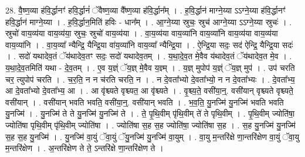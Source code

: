 \documentclass[17pt]{extarticle}
\begin{document}
28. वै॒ष्ण॒व्या ह॑वि॒र्द्धानꣳ॑ हवि॒र्द्धानं॑ ॅवैष्ण॒व्या वै᳚ष्ण॒व्या ह॑वि॒र्द्धान᳚म् । . ह॒वि॒र्द्धान॑ माग्ने॒य्या ऽऽग्ने॒य्या ह॑वि॒र्द्धानꣳ॑ हवि॒र्द्धान॑ माग्ने॒य्या । . ह॒वि॒र्द्धान॒मिति॑ हविः - धान᳚म् । . आ॒ग्ने॒य्या स्रुचः॒ स्रुच॑ आग्ने॒य्या ऽऽग्ने॒य्या स्रुचः॑ । . स्रुचो॑ वाय॒व्य॑या वाय॒व्य॑या॒ स्रुचः॒ स्रुचो॑ वाय॒व्य॑या । . वा॒य॒व्य॑या वाय॒व्या॑नि वाय॒व्या॑नि वाय॒व्य॑या वाय॒व्य॑या वाय॒व्या॑नि । . वा॒य॒व्या᳚ न्यैन्द्रि॒ यैन्द्रि॒या वा॑य॒व्या॑नि वाय॒व्या᳚ न्यैन्द्रि॒या । . ऐ॒न्द्रि॒या सदः॒ सद॑ ऐन्द्रि॒ यैन्द्रि॒या सदः॑ । . सदो॑ यथादेव॒तं ॅय॑थादेव॒तꣳ सदः॒ सदो॑ यथादेव॒तम् । . य॒था॒दे॒व॒त मे॒वैव य॑थादेव॒तं ॅय॑थादेव॒त मे॒व । . य॒था॒दे॒व॒तमिति॑ यथा - दे॒व॒तम् । . ए॒व य॒ज्ञ्ं ॅय॒ज्ञ् मे॒वैव य॒ज्ञ्म् । . य॒ज्ञ् मुपोप॑ य॒ज्ञ्ं ॅय॒ज्ञ् मुप॑ । . उप॑ चरति चर॒ त्युपोप॑ चरति । . च॒र॒ति॒ न न च॑रति चरति॒ न । . न दे॒वता᳚भ्यो दे॒वता᳚भ्यो॒ न न दे॒वता᳚भ्यः । . दे॒वता᳚भ्य॒ आ दे॒वता᳚भ्यो दे॒वता᳚भ्य॒ आ । . आ वृ॑श्च्यते वृश्च्यत॒ आ वृ॑श्च्यते । . वृ॒श्च्य॒ते॒ वसी॑या॒न्॒. वसी॑यान् वृश्च्यते वृश्च्यते॒ वसी॑यान् । . वसी॑यान् भवति भवति॒ वसी॑या॒न्॒. वसी॑यान् भवति । . भ॒व॒ति॒ यु॒नज्मि॑ यु॒नज्मि॑ भवति भवति यु॒नज्मि॑ । . यु॒नज्मि॑ ते ते यु॒नज्मि॑ यु॒नज्मि॑ ते । . ते॒ पृ॒थि॒वीम् पृ॑थि॒वीम् ते॑ ते पृथि॒वीम् । . पृ॒थि॒वीम् ज्योति॑षा॒ ज्योति॑षा पृथि॒वीम् पृ॑थि॒वीम् ज्योति॑षा । . ज्योति॑षा स॒ह स॒ह ज्योति॑षा॒ ज्योति॑षा स॒ह । . स॒ह यु॒नज्मि॑ यु॒नज्मि॑ स॒ह स॒ह यु॒नज्मि॑ । . यु॒नज्मि॑ वा॒युं ॅवा॒युं ॅयु॒नज्मि॑ यु॒नज्मि॑ वा॒युम् । . वा॒यु म॒न्तरि॑क्षे णा॒न्तरि॑क्षेण वा॒युं ॅवा॒यु म॒न्तरि॑क्षेण । . अ॒न्तरि॑क्षेण ते ते॒ ऽन्तरि॑क्षे णा॒न्तरि॑क्षेण ते । \newline
\end{document}
